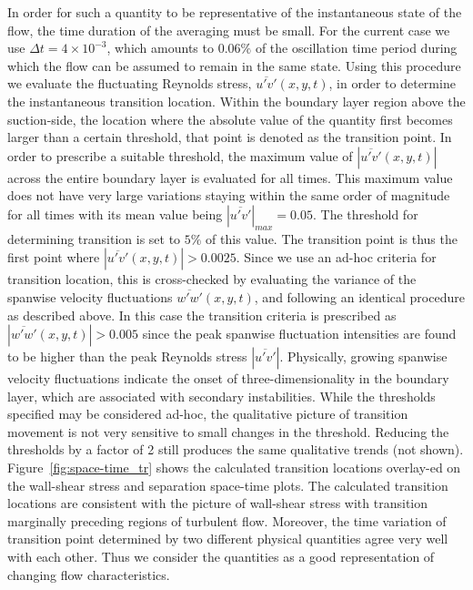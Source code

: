 In order for such a quantity to be representative of the instantaneous state of the flow, the time duration of the averaging must be small. For the current case we use $\Delta t=4\times10^{-3}$, which amounts to $0.06\%$ of the oscillation time period during which the flow can be assumed to remain in the same state. Using this procedure we evaluate the fluctuating Reynolds stress, $\overline{u'v'}(x,y,t)$, in order to determine the instantaneous transition location. Within the boundary layer region above the suction-side, the location where the absolute value of the quantity first becomes larger than a certain threshold, that point is denoted as the transition point. In order to prescribe a suitable threshold, the maximum value of $|\overline{u'v'}(x,y,t)|$ across the entire boundary layer is evaluated for all times. This maximum value does not have very large variations staying within the same order of magnitude for all times with its mean value being $|\overline{u'v'}|_{max}=0.05$. The threshold for determining transition is set to $5\%$ of this value. The transition point is thus the first point where $|\overline{u'v'}(x,y,t)|>0.0025$. Since we use an ad-hoc criteria for transition location, this is cross-checked by evaluating the variance of the spanwise velocity fluctuations $\overline{w'w'}(x,y,t)$, and following an identical procedure as described above. In this case the transition criteria is prescribed as $|\overline{w'w'}(x,y,t)|>0.005$ since the peak spanwise fluctuation intensities are found to be higher than the peak Reynolds stress $|\overline{u'v'}|$. Physically, growing spanwise velocity fluctuations indicate the onset of three-dimensionality in the boundary layer, which are associated with secondary instabilities. While the thresholds specified may be considered ad-hoc, the qualitative picture of transition movement is not very sensitive to small changes in the threshold. Reducing the thresholds by a factor of 2 still produces the same qualitative trends (not shown). Figure~\ref{fig:space-time_tr} shows the calculated transition locations overlay-ed on the wall-shear stress and separation space-time plots. The calculated transition locations are consistent with the picture of wall-shear stress with transition marginally preceding regions of turbulent flow. Moreover, the time variation of transition point determined by two different physical quantities agree very well with each other. Thus we consider the quantities as a good representation of changing flow characteristics.
